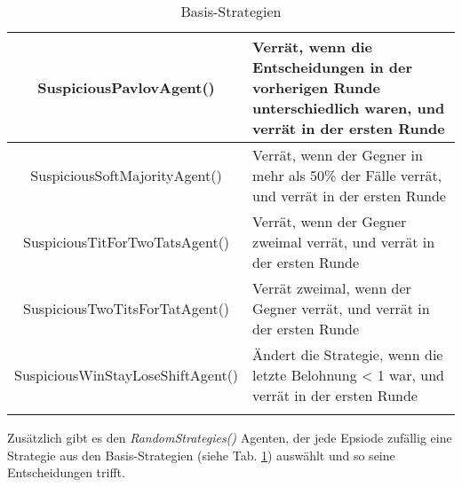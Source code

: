 \begin{longtable}{|c|m{7cm}|}
    \hline
    SuspiciousPavlovAgent() & Verrät, wenn die Entscheidungen in der vorherigen Runde unterschiedlich waren, und verrät in der ersten Runde \\
    \hline
    SuspiciousSoftMajorityAgent() & Verrät, wenn der Gegner in mehr als 50\% der Fälle verrät, und verrät in der ersten Runde \\
    \hline
    SuspiciousTitForTwoTatsAgent() & Verrät, wenn der Gegner zweimal verrät, und verrät in der ersten Runde \\
    \hline
    SuspiciousTwoTitsForTatAgent() & Verrät zweimal, wenn der Gegner verrät, und verrät in der ersten Runde \\
    \hline
    SuspiciousWinStayLoseShiftAgent() & Ändert die Strategie, wenn die letzte Belohnung < 1 war, und verrät in der ersten Runde \\
    \hline
\caption{Basis-Strategien}
\label{table:basestrategies}
\end{longtable}
Zusätzlich gibt es den \textit{RandomStrategies()} Agenten, der jede Epsiode  zufällig  eine Strategie aus den 
Basis-Strategien (siehe Tab. \ref{table:basestrategies}) auswählt und so seine
Entscheidungen trifft. \\

